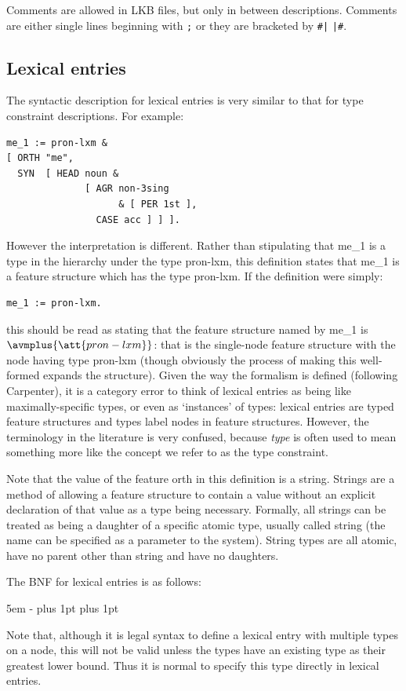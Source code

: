 \documentclass[12pt]{report}
\newcommand{\newterm}[1]{{\it #1}}
\begin{document}
Comments are allowed in LKB files, but only in between descriptions.
Comments are either single lines
beginning with {\tt ;} or they are bracketed by {\tt \#|} {\tt |\#}.



\subsection{Lexical entries}
\label{lexsyntax}
The syntactic description for lexical entries is
very similar to that for type constraint descriptions.  For example:
\begin{verbatim}
me_1 := pron-lxm & 
[ ORTH "me",
  SYN  [ HEAD noun & 
              [ AGR non-3sing 
                    & [ PER 1st ],
                CASE acc ] ] ].
\end{verbatim}
However the interpretation is different.  Rather than
stipulating that me\_1 is a type in the hierarchy under the
type {\type pron-lxm}, this definition 
states that me\_1 is a feature structure which has the
type {\type pron-lxm}.  If the definition were simply:
\begin{verbatim}
me_1 := pron-lxm.
\end{verbatim}
this should be
read as stating that the feature structure named by me\_1 is
{\tiny $\avmplus{\att{pron-lxm}}$}: that is the single-node 
feature structure with the node having type {\type pron-lxm}
(though obviously the process of making this well-formed expands the
structure).
Given the way the formalism is defined (following Carpenter),
it is a category error to
think of lexical entries as being like maximally-specific types,
or even as `instances' of types: lexical entries are typed feature 
structures and types label nodes in feature structures.
However, the terminology in the literature is very confused,
because \newterm{type} is often used to mean something more like the concept
we refer to as the type constraint.  

Note that the value of the feature {\feature orth} in this
definition is a string.
Strings are a method of allowing a feature structure to contain a 
value without an explicit declaration of that value as a type
being necessary.  Formally, all strings can be treated as
being a daughter of a specific atomic type, usually called {\type string}
(the name can be specified as a parameter to the system).
String types are all atomic,
have no parent other than {\type string} and have no daughters.

The BNF for lexical entries is as follows:
\begin{list}{}
   {\leftmargin 5em
    \itemindent -\leftmargin
    \itemsep 0pt plus 1pt
    \parsep 0pt plus 1pt}
\end{list}
Note that, although it is legal syntax to define a 
lexical entry with multiple types on a node,
this will not be valid unless the types have an
existing type as their greatest lower bound.
Thus it is normal to specify this type directly
in lexical entries.
\end{document}
